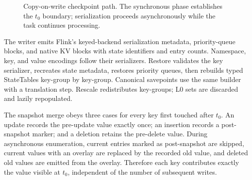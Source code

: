 \documentclass[sigconf]{acmart}
\begin{document}
\begin{figure}[t]
\centering
{}
\caption{Copy-on-write checkpoint path. The synchronous phase establishes the $t_0$ boundary; serialization proceeds asynchronously while the task continues processing.}
\label{fig:cow}
\end{figure}

The writer emits Flink's keyed-backend serialization metadata, priority-queue blocks, and native KV blocks with state identifiers and entry counts. Namespace, key, and value encodings follow their serializers. Restore validates the key serializer, recreates state metadata, restores priority queues, then rebuilds typed StateTables key-group by key-group. Canonical savepoints use the same builder with a translation step. Rescale redistributes key-groups; L0 sets are discarded and lazily repopulated.

The snapshot merge obeys three cases for every key first touched after $t_0$. An update records the pre-update value exactly once; an insertion records a post-snapshot marker; and a deletion retains the pre-delete value. During asynchronous enumeration, current entries marked as post-snapshot are skipped, current values with an overlay are replaced by the recorded old value, and deleted old values are emitted from the overlay. Therefore each key contributes exactly the value visible at $t_0$, independent of the number of subsequent writes.
\end{document}
